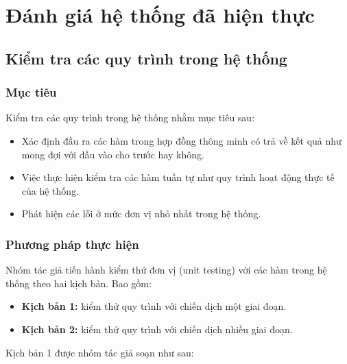 \documentclass[../main-report.tex]{subfiles}
\begin{document}
\section{Đánh giá hệ thống đã hiện thực}
\subsection{Kiểm tra các quy trình trong hệ thống}
\subsubsection{Mục tiêu}
Kiểm tra các quy trình trong hệ thống nhằm mục tiêu sau:

\begin{itemize}
\item Xác định đầu ra các hàm trong hợp đồng thông minh có trả về kết quả như mong đợi với đầu vào cho trước hay không.
\item Việc thực hiện kiểm tra các hàm tuần tự như quy trình hoạt động thực tế của hệ thống.
\item Phát hiện các lỗi ở mức đơn vị nhỏ nhất trong hệ thống.
\end{itemize}
\subsubsection{Phương pháp thực hiện}
Nhóm tác giả tiến hành kiểm thử đơn vị (unit testing) với các hàm trong hệ thống theo hai kịch bản. Bao gồm:

\begin{itemize}
\item \textbf{Kịch bản 1:} kiểm thử quy trình với chiến dịch một giai đoạn.
\item \textbf{Kịch bản 2:} kiểm thử quy trình với chiến dịch nhiều giai đoạn.
\end{itemize}

Kịch bản 1 được nhóm tác giả soạn như sau:
\end{document}

